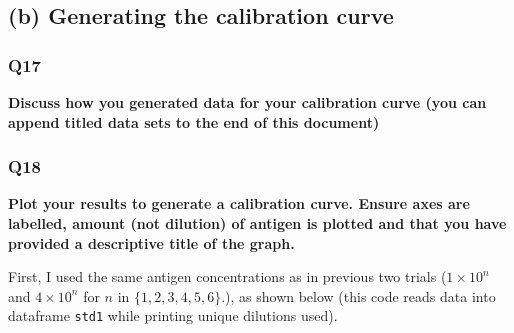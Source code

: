 \documentclass[
]{article}
\newenvironment{Shaded}{\begin{snugshade}}{\end{snugshade}}
\newcommand{\CommentTok}[1]{\textcolor[rgb]{0.56,0.35,0.01}{\textit{#1}}}
\newcommand{\ControlFlowTok}[1]{\textcolor[rgb]{0.13,0.29,0.53}{\textbf{#1}}}
\newcommand{\DataTypeTok}[1]{\textcolor[rgb]{0.13,0.29,0.53}{#1}}
\newcommand{\DecValTok}[1]{\textcolor[rgb]{0.00,0.00,0.81}{#1}}
\newcommand{\KeywordTok}[1]{\textcolor[rgb]{0.13,0.29,0.53}{\textbf{#1}}}
\newcommand{\NormalTok}[1]{#1}
\newcommand{\OperatorTok}[1]{\textcolor[rgb]{0.81,0.36,0.00}{\textbf{#1}}}
\newcommand{\StringTok}[1]{\textcolor[rgb]{0.31,0.60,0.02}{#1}}
\begin{document}
\hypertarget{b-generating-the-calibration-curve}{%
\subsection*{(b) Generating the calibration curve}\label{b-generating-the-calibration-curve}}

\hypertarget{q17}{%
\subsubsection*{Q17}\label{q17}}

\textbf{Discuss how you generated data for your calibration curve (you can append titled data sets to the end of this document)}

\hypertarget{q18}{%
\subsubsection*{Q18}\label{q18}}

\textbf{Plot your results to generate a calibration curve. Ensure axes are labelled, amount (not dilution) of antigen is plotted and that you have provided a descriptive title of the graph.}

First, I used the same antigen concentrations as in previous two trials (\(1\times10^n\) and \(4\times10^n\) for \(n\) in \(\{1,2,3,4,5,6\}\).), as shown below (this code reads data into dataframe \texttt{std1} while printing unique dilutions used).

\begin{Shaded}
\end{Shaded}
\end{document}
